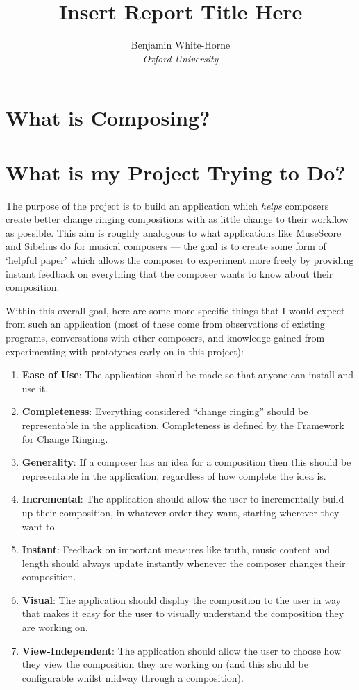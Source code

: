 \documentclass[12pt]{article}
\title{Insert Report Title Here}
\author{Benjamin White-Horne \\ \emph{Oxford University}}
\begin{document}
\maketitle
\pagebreak
\tableofcontents
\pagebreak

\section{What is Composing?}

\section{What is my Project Trying to Do?}

The purpose of the project is to build an application which \emph{helps} composers create better
change ringing compositions with as little change to their workflow as possible.  This aim is
roughly analogous to what applications like MuseScore and Sibelius do for musical composers --- the
goal is to create some form of `helpful paper' which allows the composer to experiment more freely
by providing instant feedback on everything that the composer wants to know about their composition.

Within this overall goal, here are some more specific things that I would expect from such an
application (most of these come from observations of existing programs, conversations with other
composers, and knowledge gained from experimenting with prototypes early on in this project):

\begin{enumerate}
    \item \textbf{Ease of Use}: The application should be made so that anyone can install and use
        it.
    \item \textbf{Completeness}: Everything considered ``change ringing'' should be representable in
        the application.  Completeness is defined by the Framework for Change Ringing.
    \item \textbf{Generality}: If a composer has an idea for a composition then this should be
        representable in the application, regardless of how complete the idea is.
    \item \textbf{Incremental}: The application should allow the user to incrementally build up
        their composition, in whatever order they want, starting wherever they want to.
    \item \textbf{Instant}: Feedback on important measures like truth, music content and length
        should always update instantly whenever the composer changes their composition.
    \item \textbf{Visual}: The application should display the composition to the user in way that
        makes it easy for the user to visually understand the composition they are working on.
    \item \textbf{View-Independent}: The application should allow the user to choose how they view
        the composition they are working on (and this should be configurable whilst midway through a
        composition).
\end{enumerate}
\end{document}
